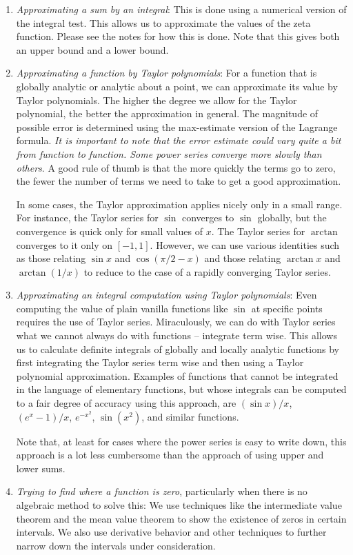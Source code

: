 \documentclass[10pt]{amsart}
\begin{document}
\begin{enumerate}
\item {\em Approximating a sum by an integral}: This is done using a
  numerical version of the integral test. This allows us to
  approximate the values of the zeta function. Please see the notes
  for how this is done. Note that this gives both an upper bound and a
  lower bound.
\item {\em Approximating a function by Taylor polynomials}: For a
  function that is globally analytic or analytic about a point, we can
  approximate its value by Taylor polynomials. The higher the degree
  we allow for the Taylor polynomial, the better the approximation in
  general. The magnitude of possible error is determined using the
  max-estimate version of the Lagrange formula. {\em It is important
  to note that the error estimate could vary quite a bit from function
  to function. Some power series converge more slowly than others}. A
  good rule of thumb is that the more quickly the terms go to zero,
  the fewer the number of terms we need to take to get a good
  approximation.

  In some cases, the Taylor approximation applies nicely only in a
  small range. For instance, the Taylor series for $\sin$ converges to
  $\sin$ globally, but the convergence is quick only for small values
  of $x$. The Taylor series for $\arctan$ converges to it only on
  $[-1,1]$. However, we can use various identities such as those
  relating $\sin x$ and $\cos(\pi/2 - x)$ and those relating $\arctan
  x$ and $\arctan(1/x)$ to reduce to the case of a rapidly converging
  Taylor series.
\item {\em Approximating an integral computation using Taylor
  polynomials}: Even computing the value of plain vanilla functions
  like $\sin$ at specific points requires the use of Taylor
  series. Miraculously, we can do with Taylor series what we cannot
  always do with functions -- integrate term wise. This allows us to
  calculate definite integrals of globally and locally analytic
  functions by first integrating the Taylor series term wise and then
  using a Taylor polynomial approximation. Examples of functions that
  cannot be integrated in the language of elementary functions, but
  whose integrals can be computed to a fair degree of accuracy using
  this approach, are $(\sin x)/x$, $(e^x - 1)/x$, $e^{-x^2}$,
  $\sin(x^2)$, and similar functions.

  Note that, at least for cases where the power series is easy to
  write down, this approach is a lot less cumbersome than the approach
  of using upper and lower sums.
\item {\em Trying to find where a function is zero}, particularly when
  there is no algebraic method to solve this: We use techniques like
  the intermediate value theorem and the mean value theorem to show
  the existence of zeros in certain intervals. We also use derivative
  behavior and other techniques to further narrow down the intervals
  under consideration.
\end{enumerate}
\end{document}
